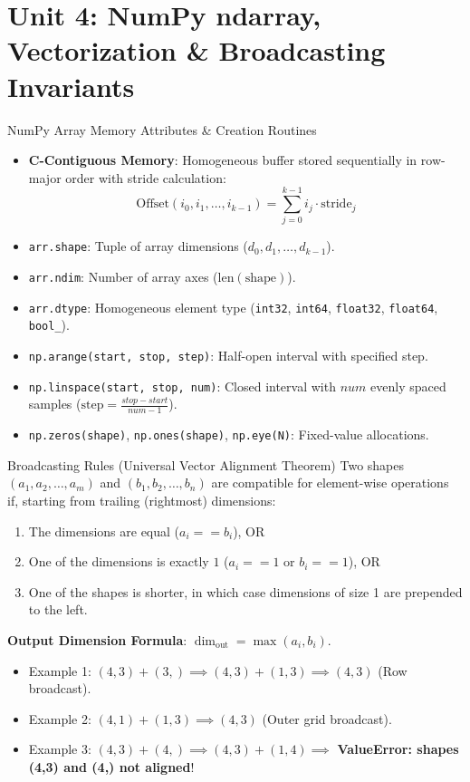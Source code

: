 \chapter{Unit 4: NumPy ndarray, Vectorization \& Broadcasting Invariants}

\begin{formulabox}{NumPy Array Memory Attributes \& Creation Routines}
\begin{itemize}[leftmargin=1.5em, itemsep=2pt]
    \item \textbf{C-Contiguous Memory}: Homogeneous buffer stored sequentially in row-major order with stride calculation:
    \begin{equation*}
    \text{Offset}(i_0, i_1, \dots, i_{k-1}) = \sum_{j=0}^{k-1} i_j \cdot \text{stride}_j
    \end{equation*}
    \item \texttt{arr.shape}: Tuple of array dimensions ($d_0, d_1, \dots, d_{k-1}$).
    \item \texttt{arr.ndim}: Number of array axes ($\text{len}(\text{shape})$).
    \item \texttt{arr.dtype}: Homogeneous element type (\texttt{int32}, \texttt{int64}, \texttt{float32}, \texttt{float64}, \texttt{bool\_}).
    \item \texttt{np.arange(start, stop, step)}: Half-open interval with specified step.
    \item \texttt{np.linspace(start, stop, num)}: Closed interval with $num$ evenly spaced samples ($\text{step} = \frac{stop - start}{num - 1}$).
    \item \texttt{np.zeros(shape)}, \texttt{np.ones(shape)}, \texttt{np.eye(N)}: Fixed-value allocations.
\end{itemize}
\end{formulabox}

\begin{formulabox}{Broadcasting Rules (Universal Vector Alignment Theorem)}
Two shapes $(a_1, a_2, \dots, a_m)$ and $(b_1, b_2, \dots, b_n)$ are compatible for element-wise operations if, starting from trailing (rightmost) dimensions:
\begin{enumerate}[leftmargin=1.5em, itemsep=2pt]
    \item The dimensions are equal ($a_i == b_i$), OR
    \item One of the dimensions is exactly $1$ ($a_i == 1$ or $b_i == 1$), OR
    \item One of the shapes is shorter, in which case dimensions of size 1 are prepended to the left.
\end{enumerate}
\textbf{Output Dimension Formula}: $\dim_{\text{out}} = \max(a_i, b_i)$.
\begin{itemize}
    \item Example 1: $(4, 3) + (3,) \implies (4, 3) + (1, 3) \implies (4, 3)$ (Row broadcast).
    \item Example 2: $(4, 1) + (1, 3) \implies (4, 3)$ (Outer grid broadcast).
    \item Example 3: $(4, 3) + (4,) \implies (4, 3) + (1, 4) \implies$ \textbf{ValueError: shapes (4,3) and (4,) not aligned}!
\end{itemize}
\end{formulabox}

